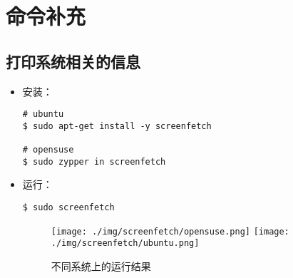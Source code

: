 
\chapter{命令补充}


\section{打印系统相关的信息}
\begin{itemize}
\item 安装：
\begin{lstlisting}
# ubuntu 
$ sudo apt-get install -y screenfetch 

# opensuse 
$ sudo zypper in screenfetch
\end{lstlisting}

\item 运行：
\begin{lstlisting}
$ sudo screenfetch
\end{lstlisting}


\begin{figure}[htp]  
    \centering
    \texttt{[image: ./img/screenfetch/opensuse.png]}
    \texttt{[image: ./img/screenfetch/ubuntu.png]}
    \caption{不同系统上的运行结果} %
    \label{fig:screenfetch} %
\end{figure}
\end{itemize}

